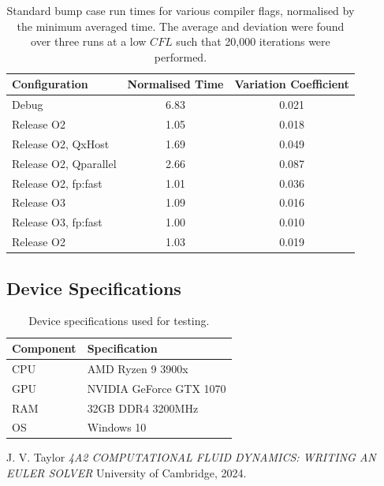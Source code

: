 \documentclass{article}
\begin{document}
\begin{table}[H]
    \centering
    \begin{tabular}{lcc}
        \toprule
        \textbf{Configuration} & \textbf{Normalised Time}  & \textbf{Variation Coefficient} \\
        \midrule
        Debug & 6.83 & 0.021 \\
        Release O2 & 1.05 & 0.018 \\
        Release O2, QxHost & 1.69 & 0.049 \\
        Release O2, Qparallel & 2.66 & 0.087 \\
        Release O2, fp:fast & 1.01 & 0.036 \\
        Release O3 & 1.09 & 0.016 \\
        Release O3, fp:fast & 1.00 & 0.010 \\
        Release O2 & 1.03 & 0.019 \\
        \bottomrule
    \end{tabular}
    \caption{Standard bump case run times for various compiler flags, normalised by the minimum averaged time. The average and deviation were found over three runs at a low $CFL$ such that 20,000 iterations were performed.}
    \label{tab:performance}
\end{table}

\subsection{Device Specifications}

\begin{table}[H]
    \centering
    \begin{tabular}{ll}
        \toprule
        \textbf{Component} & \textbf{Specification} \\
        \midrule
        CPU & AMD Ryzen 9 3900x \\
        GPU & NVIDIA GeForce GTX 1070 \\
        RAM & 32GB DDR4 3200MHz \\
        OS & Windows 10 \\
        \bottomrule
    \end{tabular}
    \caption{Device specifications used for testing.}
    \label{tab:device}
\end{table}

\begin{thebibliography}{9}

  J. V. Taylor
  \emph{4A2 COMPUTATIONAL FLUID DYNAMICS: WRITING AN EULER SOLVER}
  University of Cambridge,
  2024.

\end{thebibliography}
\end{document}

